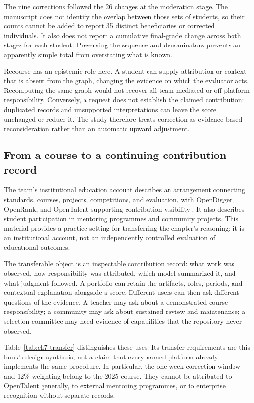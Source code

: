 The nine corrections followed the 26 changes at the moderation stage. The manuscript does not identify the overlap between those sets of students, so their counts cannot be added to report 35 distinct beneficiaries or corrected individuals. It also does not report a cumulative final-grade change across both stages for each student. Preserving the sequence and denominators prevents an apparently simple total from overstating what is known.

Recourse has an epistemic role here. A student can supply attribution or context that is absent from the graph, changing the evidence on which the evaluator acts. Recomputing the same graph would not recover all team-mediated or off-platform responsibility. Conversely, a request does not establish the claimed contribution: duplicated records and unsupported interpretations can leave the score unchanged or reduce it. The study therefore treats correction as evidence-based reconsideration rather than an automatic upward adjustment.

\subsection{From a course to a continuing contribution record}
The team's institutional education account describes an arrangement connecting standards, courses, projects, competitions, and evaluation, with OpenDigger, OpenRank, and OpenTalent supporting contribution visibility \citep{xlabeducation}. It also describes student participation in mentoring programmes and community projects. This material provides a practice setting for transferring the chapter's reasoning; it is an institutional account, not an independently controlled evaluation of educational outcomes.

The transferable object is an inspectable contribution record: what work was observed, how responsibility was attributed, which model summarized it, and what judgment followed. A portfolio can retain the artifacts, roles, periods, and contextual explanation alongside a score. Different users can then ask different questions of the evidence. A teacher may ask about a demonstrated course responsibility; a community may ask about sustained review and maintenance; a selection committee may need evidence of capabilities that the repository never observed.

Table~\ref{tab:ch7-transfer} distinguishes these uses. Its transfer requirements are this book's design synthesis, not a claim that every named platform already implements the same procedure. In particular, the one-week correction window and 12\% weighting belong to the 2025 course. They cannot be attributed to OpenTalent generally, to external mentoring programmes, or to enterprise recognition without separate records.

